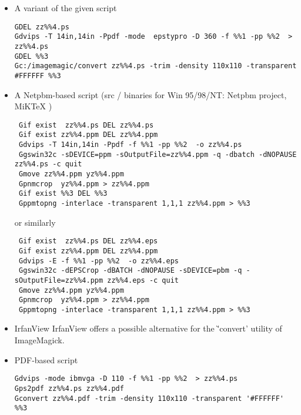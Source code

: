 \documentclass{article}
\begin{document}
\begin{itemize}



\item{A variant of the given script}
\begin{verbatim}
GDEL zz%%4.ps
Gdvips -T 14in,14in -Ppdf -mode  epstypro -D 360 -f %%1 -pp %%2  > zz%%4.ps
GDEL %%3
Gc:/imagemagic/convert zz%%4.ps -trim -density 110x110 -transparent #FFFFFF %%3
\end{verbatim}
\item{A 
Netpbm-based script
(src\EndLink{} /
binaries for Win 95/98/NT:
Netpbm project\EndLink,
MiK\TeX\EndLink
)}

\begin{verbatim}
 Gif exist  zz%%4.ps DEL zz%%4.ps
 Gif exist zz%%4.ppm DEL zz%%4.ppm
 Gdvips -T 14in,14in -Ppdf -f %%1 -pp %%2  -o zz%%4.ps
 Ggswin32c -sDEVICE=ppm -sOutputFile=zz%%4.ppm -q -dbatch -dNOPAUSE zz%%4.ps -c quit
 Gmove zz%%4.ppm yz%%4.ppm
 Gpnmcrop  yz%%4.ppm > zz%%4.ppm
 Gif exist %%3 DEL %%3
 Gppmtopng -interlace -transparent 1,1,1 zz%%4.ppm > %%3
\end{verbatim}
 
or similarly


\begin{verbatim}
 Gif exist  zz%%4.ps DEL zz%%4.eps
 Gif exist zz%%4.ppm DEL zz%%4.ppm
 Gdvips -E -f %%1 -pp %%2  -o zz%%4.eps
 Ggswin32c -dEPSCrop -dBATCH -dNOPAUSE -sDEVICE=pbm -q -sOutputFile=zz%%4.ppm zz%%4.eps -c quit
 Gmove zz%%4.ppm yz%%4.ppm
 Gpnmcrop  yz%%4.ppm > zz%%4.ppm
 Gppmtopng -interlace -transparent 1,1,1 zz%%4.ppm > %%3
\end{verbatim}

\item {IrfanView}
IrfanView\EndLink{}
offers a possible alternative for the
\`'convert' utility of ImageMagick.

\item{PDF-based script}
\begin{verbatim}
Gdvips -mode ibmvga -D 110 -f %%1 -pp %%2  > zz%%4.ps
Gps2pdf zz%%4.ps zz%%4.pdf
Gconvert zz%%4.pdf -trim -density 110x110 -transparent '#FFFFFF' %%3
\end{verbatim}


\end{itemize}
\end{document}
